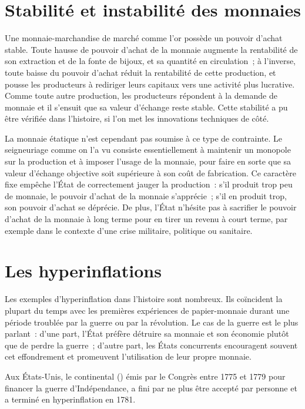 \section{Stabilité et instabilité des monnaies}

Une monnaie-marchandise de marché comme l'or possède un pouvoir d'achat stable. Toute hausse de pouvoir d'achat de la monnaie augmente la rentabilité de son extraction et de la fonte de bijoux, et sa quantité en circulation~; à l'inverse, toute baisse du pouvoir d'achat réduit la rentabilité de cette production, et pousse les producteurs à rediriger leurs capitaux vers une activité plus lucrative. Comme toute autre production, les producteurs répondent à la demande de monnaie et il s'ensuit que sa valeur d'échange reste stable. Cette stabilité a pu être vérifiée dans l'histoire, si l'on met les innovations techniques de côté.

La monnaie étatique n'est cependant pas soumise à ce type de contrainte. Le seigneuriage comme on l'a vu consiste essentiellement à maintenir un monopole sur la production et à imposer l'usage de la monnaie, pour faire en sorte que sa valeur d'échange objective soit supérieure à son coût de fabrication. Ce caractère fixe empêche l'État de correctement jauger la production~: s'il produit trop peu de monnaie, le pouvoir d'achat de la monnaie s'apprécie~; s'il en produit trop, son pouvoir d'achat se déprécie. De plus, l'État n'hésite pas à sacrifier le pouvoir d'achat de la monnaie à long terme pour en tirer un revenu à court terme, par exemple dans le contexte d'une crise militaire, politique ou sanitaire.

\section{Les hyperinflations}

Les exemples d'hyperinflation dans l'histoire sont nombreux. Ils coïncident la plupart du temps avec les premières expériences de papier-monnaie durant une période troublée par la guerre ou par la révolution. Le cas de la guerre est le plus parlant~: d'une part, l'État préfère détruire sa monnaie et son économie plutôt que de perdre la guerre~; d'autre part, les États concurrents encouragent souvent cet effondrement et promeuvent l'utilisation de leur propre monnaie.

Aux États-Unis, le continental () émis par le Congrès entre 1775 et 1779 pour financer la guerre d'Indépendance, a fini par ne plus être accepté par personne et a terminé en hyperinflation en 1781. %

